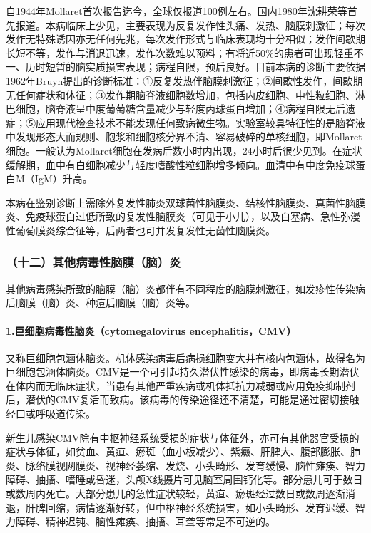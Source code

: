 自1944年Mollaret首次报告迄今，全球仅报道100例左右。国内1980年沈耕荣等首先报道。本病临床上少见，主要表现为反复发作性头痛、发热、脑膜刺激征；每次发作无特殊诱因亦无任何先兆，每次发作形式与临床表现均十分相似；发作间歇期长短不等，发作与消退迅速，发作次数难以预料；有将近50\%的患者可出现轻重不一、历时短暂的脑实质损害表现；病程自限，预后良好。目前本病的诊断主要依据1962年Bruyn提出的诊断标准：①反复发热伴脑膜刺激征；②间歇性发作，间歇期无任何症状和体征；③发作期脑脊液细胞数增加，包括内皮细胞、中性粒细胞、淋巴细胞，脑脊液呈中度葡萄糖含量减少与轻度丙球蛋白增加；④病程自限无后遗症；⑤应用现代检查技术不能发现任何致病微生物。实验室较具特征性的是脑脊液中发现形态大而规则、胞浆和细胞核分界不清、容易破碎的单核细胞，即Mollaret细胞。一般认为Mollaret细胞在发病后数小时内出现，24小时后很少见到。在症状缓解期，血中有白细胞减少与轻度嗜酸性粒细胞增多倾向。血清中有中度免疫球蛋白M（IgM）升高。

本病在鉴别诊断上需除外复发性肺炎双球菌性脑膜炎、结核性脑膜炎、真菌性脑膜炎、免疫球蛋白过低所致的复发性脑膜炎（可见于小儿），以及白塞病、急性弥漫性葡萄膜炎综合征等，后两者也可并发复发性无菌性脑膜炎。

\subsubsection{（十二）其他病毒性脑膜（脑）炎}

其他病毒感染所致的脑膜（脑）炎都伴有不同程度的脑膜刺激征，如发疹性传染病后脑膜（脑）炎、种痘后脑膜（脑）炎等。

\paragraph{1.巨细胞病毒性脑炎（cytomegalovirus encephalitis，CMV）}

又称巨细胞包涵体脑炎。机体感染病毒后病损细胞变大并有核内包涵体，故得名为巨细胞包涵体脑炎。CMV是一个可引起持久潜伏性感染的病毒，即病毒长期潜伏在体内而无临床症状，当患有其他严重疾病或机体抵抗力减弱或应用免疫抑制剂后，潜伏的CMV复活而致病。该病毒的传染途径还不清楚，可能是通过密切接触经口或呼吸道传染。

新生儿感染CMV除有中枢神经系统受损的症状与体征外，亦可有其他器官受损的症状与体征，如贫血、黄疸、瘀斑（血小板减少）、紫癜、肝脾大、腹部膨胀、肺炎、脉络膜视网膜炎、视神经萎缩、发烧、小头畸形、发育缓慢、脑性瘫痪、智力障碍、抽搐、嗜睡或昏迷，头颅X线摄片可见脑室周围钙化等。部分患儿可于数日或数周内死亡。大部分患儿的急性症状较轻，黄疸、瘀斑经过数日或数周逐渐消退，肝脾回缩，病情逐渐好转，但中枢神经系统损害，如小头畸形、发育迟缓、智力障碍、精神迟钝、脑性瘫痪、抽搐、耳聋等常是不可逆的。

